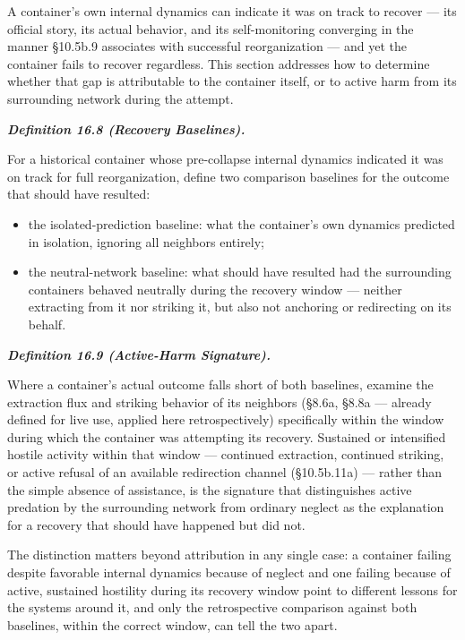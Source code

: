 \documentclass[
]{article}
\begin{document}
A container's own internal dynamics can indicate it was on track to
recover --- its official story, its actual behavior, and its
self-monitoring converging in the manner §10.5b.9 associates with
successful reorganization --- and yet the container fails to recover
regardless. This section addresses how to determine whether that gap is
attributable to the container itself, or to active harm from its
surrounding network during the attempt.

\emph{\textbf{Definition 16.8 (Recovery Baselines).}}

For a historical container whose pre-collapse internal dynamics
indicated it was on track for full reorganization, define two comparison
baselines for the outcome that should have resulted:

\begin{itemize}
\item
  the isolated-prediction baseline: what the container's own dynamics
  predicted in isolation, ignoring all neighbors entirely;
\item
  the neutral-network baseline: what should have resulted had the
  surrounding containers behaved neutrally during the recovery window
  --- neither extracting from it nor striking it, but also not anchoring
  or redirecting on its behalf.
\end{itemize}

\emph{\textbf{Definition 16.9 (Active-Harm Signature).}}

Where a container's actual outcome falls short of both baselines,
examine the extraction flux and striking behavior of its neighbors
(§8.6a, §8.8a --- already defined for live use, applied here
retrospectively) specifically within the window during which the
container was attempting its recovery. Sustained or intensified hostile
activity within that window --- continued extraction, continued
striking, or active refusal of an available redirection channel
(§10.5b.11a) --- rather than the simple absence of assistance, is the
signature that distinguishes active predation by the surrounding network
from ordinary neglect as the explanation for a recovery that should have
happened but did not.

The distinction matters beyond attribution in any single case: a
container failing despite favorable internal dynamics because of neglect
and one failing because of active, sustained hostility during its
recovery window point to different lessons for the systems around it,
and only the retrospective comparison against both baselines, within the
correct window, can tell the two apart.
\end{document}
